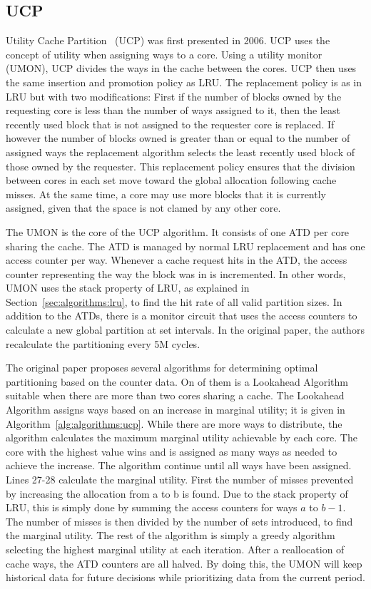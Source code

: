 \subsection{UCP}
\label{sec:algorithms:ucp}

Utility Cache Partition~\cite{Qureshi2006} (UCP) was first presented in 2006. 
UCP uses the concept of utility when assigning ways to a core.
Using a utility monitor (UMON), UCP divides the ways in the cache between the cores.
UCP then uses the same insertion and promotion policy as LRU.
The replacement policy is as in LRU but with two modifications:
First if the number of blocks owned by the requesting core is less than the number of ways assigned to it, then the least recently used block that is not assigned to the requester core is replaced.
If however the number of blocks owned is greater than or equal to the number of assigned ways the replacement algorithm selects the least recently used block of those owned by the requester.
This replacement policy ensures that the division between cores in each set move toward the global allocation following cache misses.
At the same time, a core may use more blocks that it is currently assigned, given that the space is not clamed by any other core.

The UMON is the core of the UCP algorithm.
It consists of one ATD per core sharing the cache. 
The ATD is managed by normal LRU replacement and has one access counter per way.
Whenever a cache request hits in the ATD, the access counter representing the way the block was in is incremented.
In other words, UMON uses the stack property of LRU, as explained in Section~\ref{sec:algorithms:lru}, to find the hit rate of all valid partition sizes.
In addition to the ATDs, there is a monitor circuit that uses the access counters to calculate a new global partition at set intervals.
In the original paper, the authors recalculate the partitioning every 5M cycles.

The original paper proposes several algorithms for determining optimal partitioning based on the counter data. 
On of them is a Lookahead Algorithm suitable when there are more than two cores sharing a cache.
The Lookahead Algorithm assigns ways based on an increase in marginal utility; it is given in Algorithm~\ref{alg:algorithms:ucp}.
While there are more ways to distribute, the algorithm calculates the maximum marginal utility achievable by each core. 
The core with the highest value wins and is assigned as many ways as needed to achieve the increase.
The algorithm continue until all ways have been assigned.
Lines 27-28 calculate the marginal utility. 
First the number of misses prevented by increasing the allocation from a to b is found.
Due to the stack property of LRU, this is simply done by summing the access counters for ways $a$ to $b-1$.
The number of misses is then divided by the number of sets introduced, to find the marginal utility.
The rest of the algorithm is simply a greedy algorithm selecting the highest marginal utility at each iteration.
After a reallocation of cache ways, the ATD counters are all halved.
By doing this, the UMON will keep historical data for future decisions while prioritizing data from the current period.

